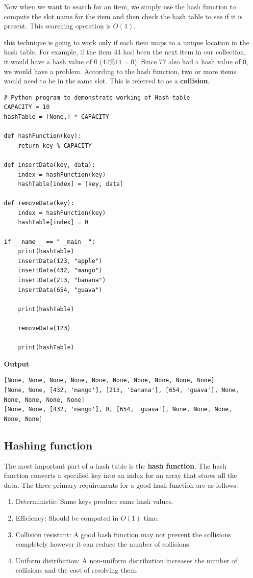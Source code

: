 \documentclass[a4paper,11pt]{book}
\begin{document}
\noindent Now when we want to search for an item, we simply use the hash function to compute the slot name for the item and then check the hash table to see if it is present. This searching operation is $O(1)$.

\noindent this technique is going to work only if each item maps to a unique location in the hash table. For example, if the item 44 had been the next item in our collection, it would have a hash value of 0 ($44\%11=0$). Since 77 also had a hash value of 0, we would have a problem. According to the hash function, two or more items would need to be in the same slot. This is referred to as a \textbf{collision}.

\begin{lstlisting}
# Python program to demonstrate working of Hash-table 
CAPACITY = 10
hashTable = [None,] * CAPACITY

def hashFunction(key):
    return key % CAPACITY

def insertData(key, data):
    index = hashFunction(key)
    hashTable[index] = [key, data]

def removeData(key):
    index = hashFunction(key)
    hashTable[index] = 0

if __name__ == "__main__":
    print(hashTable)
    insertData(123, "apple")
    insertData(432, "mango")
    insertData(213, "banana")
    insertData(654, "guava")

    print(hashTable)

    removeData(123)

    print(hashTable)
\end{lstlisting}
\textbf{Output}
\begin{lstlisting}
[None, None, None, None, None, None, None, None, None, None]
[None, None, [432, 'mango'], [213, 'banana'], [654, 'guava'], None, None, None, None, None]
[None, None, [432, 'mango'], 0, [654, 'guava'], None, None, None, None, None]
\end{lstlisting}

\subsection{Hashing function}

\noindent The most important part of a hash table is the \textbf{hash function}. The hash function converts a specified key into an index for an array that stores all the data. The three primary requirements for a good hash function are as follows:
\begin{enumerate}
    \item Deterministic: Same keys produce same hash values.
    \item Efficiency: Should be computed in $O(1)$ time.
    \item Collision resistant: A good hash function may not prevent the collisions completely however it can reduce the number of collisions.
    \item Uniform distribution: A non-uniform distribution increases the number of collisions and the cost of resolving them.
\end{enumerate}
\end{document}
